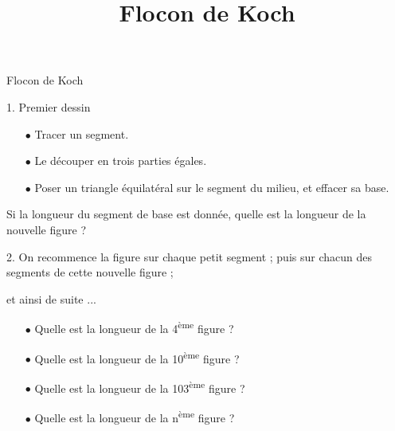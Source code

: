 \documentclass[a4paper,10pt]{beamer}
\title{Flocon de Koch}
\date{}
\author{}
\begin{document}
\begin{frame}
	\begin{center}
		{\Large Flocon de Koch}

		\vspace{2em}

	\end{center}
\end{frame}

\begin{frame}
	\hspace{-2em} 1. Premier dessin
	\begin{tcolorbox}
		\begin{itemize}
			\item[$∙$] Tracer un segment.
			\item[$∙$] Le découper en trois parties égales.
			\item[$∙$] Poser un triangle équilatéral sur le segment du milieu, et effacer sa base.
		\end{itemize}
	\end{tcolorbox}
	Si la longueur du segment de base est donnée, quelle est la longueur de la nouvelle figure ?

	\vspace{0.5em}

	\hspace{-2em} 2. On recommence la figure sur chaque petit segment ; puis sur chacun des segments de cette nouvelle figure ;

	et ainsi de suite ...
	\begin{itemize}
		\item[$∙$] Quelle est la longueur de la 4\textsuperscript{ème} figure ?
		\item[$∙$] Quelle est la longueur de la 10\textsuperscript{ème} figure ?
		\item[$∙$] Quelle est la longueur de la 103\textsuperscript{ème} figure ?
		\item[$∙$] Quelle est la longueur de la n\textsuperscript{ème} figure ?
	\end{itemize}
\end{frame}
\end{document}
